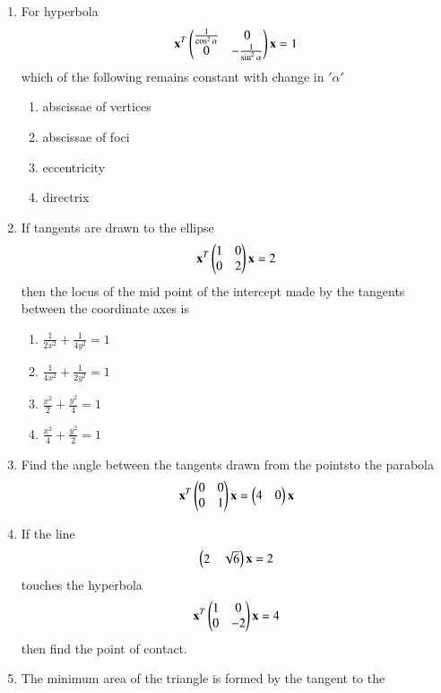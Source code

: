 \documentclass[journal,12pt,twocolumn]{IEEEtran}
\begin{document}
\begin{enumerate}[label=\arabic*]
\begin{enumerate}
    \end{enumerate}
\item For hyperbola 
    \begin{align} 
    \mathbf {x}^T\begin{pmatrix}\frac{1}{\cos^2\alpha} & 0 \\0 & -\frac{1}{\sin^2\alpha}\end{pmatrix} \mathbf{x}=1
    \end{align} which of the following remains constant with change in $'\alpha'$
    \begin{enumerate}
    \item abscissae of vertices
    \item abscissae of foci
    \item eccentricity
    \item directrix
    \end{enumerate}
\item If tangents are drawn to the ellipse 
    \begin{align}
    \mathbf{x}^T\begin{pmatrix}1&0\\0&2\end{pmatrix}\mathbf{x}=2
    \end{align}
    then the locus of the mid point of the intercept made by the tangents between the coordinate axes 	is
    \begin{enumerate}
    \item$\frac{1}{2x^2}+\frac{1}{4y^2}=1$
    \item $\frac{1}{4x^2}+\frac{1}{2y^2}=1$
    \item $\frac{x^2}{2}+\frac{y^2}{4}=1$
    \item $\frac{x^2}{4}+\frac{y^2}{2}=1$
    \end{enumerate}
\item Find the angle between the tangents drawn from the pointsto the parabola 
    \begin{align}
    \mathbf{x}^T\begin{pmatrix}0 & 0 \\0 & 1\end{pmatrix}\mathbf{x}=\begin{pmatrix}4&0\end{pmatrix}\mathbf{x} 
    \end{align}
\item If the line 
    \begin{align}
    \begin{pmatrix}2&\sqrt{6}\end{pmatrix}\mathbf{x}=2
    \end{align} touches the hyperbola
    \begin{align}
    \mathbf{x}^T\begin{pmatrix}1 & 0 \\0 & -2\end{pmatrix} \mathbf{x}=4
    \end{align}then find the point of contact.
\item The minimum area of the triangle is formed by the tangent to the 

\end{enumerate}
\end{document}
